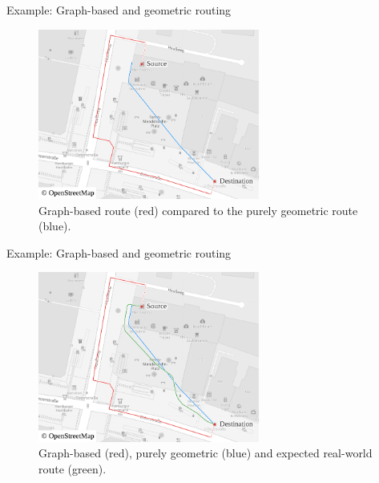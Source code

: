 \documentclass[xcolor={x11names}]{beamer}
\newenvironment{figcenter}
{%
	\parskip=0pt%
	\par%
	\nopagebreak%
	\centering%
}%
{%
	\par%
	\noindent%
	\ignorespacesafterend%
}
\begin{document}
		\begin{frame}[noframenumbering]{Example: Graph-based and geometric routing}
			\begin{figure}[t]
				\begin{figcenter}
					\includegraphics[width=0.65\textwidth]{images/qgis-routing-osterstrasse_routing-actual.pdf}
				\end{figcenter}
				\caption{Graph-based route (red) compared to the purely geometric route (blue).}
			\end{figure}
		\end{frame}
	
		\begin{frame}[noframenumbering]{Example: Graph-based and geometric routing}
			\begin{figure}[t]
				\begin{figcenter}
					\includegraphics[width=0.65\textwidth]{images/qgis-routing-osterstrasse_routing-actual-expected.pdf}
				\end{figcenter}
				\caption{Graph-based (red), purely geometric (blue) and expected real-world route (green).}
			\end{figure}
		\end{frame}
		
\end{document}

